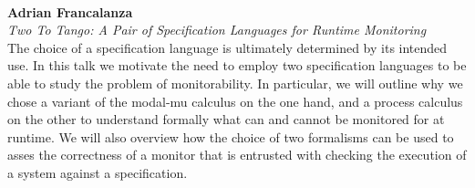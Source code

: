 \documentclass{article}
\newcounter{talkc}
\newcommand{\talk}[3]{\stepcounter{talkc}
\vspace{0.5em}~\\
\noindent
\textbf{#1}\\ 
\noindent\emph{#2}\\ 
\noindent#3\\
}
\begin{document}


%
\talk{Adrian Francalanza}{Two To Tango: A Pair of Specification Languages for Runtime Monitoring}{The choice of a specification language is ultimately determined by its intended use.  In this talk we motivate the need to employ two specification languages to be able to study the problem of monitorability.  In particular, we will outline why we chose a variant of the modal-mu calculus on the one hand, and a process calculus on the other to understand formally what can and cannot be monitored for at runtime.  We will also overview how the choice of two formalisms can be used to asses the correctness of a monitor that is entrusted with checking the execution of a system against a specification.}

\end{document}

